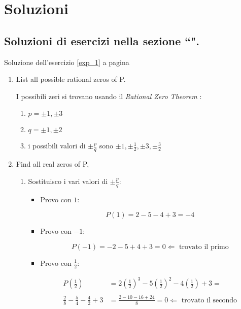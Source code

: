 \section{Soluzioni}

\subsection{Soluzioni di esercizi nella sezione ``\textbf{}".}

Soluzione dell'esercizio \ref{exp_1} a pagina \pageref{exp_1}\label{poli_1}


\begin{enumerate}
\item List all possible rational zeros of P.

I possibili zeri si trovano usando il \emph{Rational Zero Theorem} :

\begin{enumerate}
\item $p=\pm 1, \pm 3$
\item $q=\pm 1, \pm 2$
\item i possibili valori di $\pm \frac{p}{q}$ sono $\pm 1, \pm \frac{1}{2}, \pm 3, \pm \frac{3}{2}$
\end{enumerate}

\item Find all real zeros of P,

\begin{enumerate}
\item Sostituisco i vari valori di $\pm \frac{p}{q}$:
\setcounter{equation}{0}

\begin{itemize}

\item Provo con $1$:

\begin{equation*}
P(1)=2-5-4+3=-4
\end{equation*}

\item Provo con $-1$:

\begin{equation*}
P(-1)=-2-5+4+3=0 \Leftarrow \textrm{ trovato il primo}
\end{equation*}

\item Provo con $\frac{1}{2}$:

\begin{equation*}
\begin{split}
P\left(\frac{1}{2}\right)&=2\left(\frac{1}{2}\right)^3-5\left(\frac{1}{2}\right)^2-4\left(\frac{1}{2}\right)+3= \\
\\
\frac{2}{8}-\frac{5}{4}-\frac{4}{2}+3&=\frac{2-10-16+24}{8}=0 \Leftarrow \textrm{ trovato il secondo}
\end{split}
\end{equation*}


\end{itemize}
\end{enumerate}
\end{enumerate}
